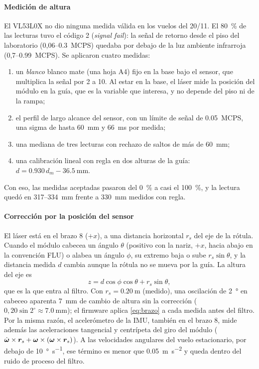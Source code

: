 \paragraph{Medición de altura} El VL53L0X no dio ninguna medida válida en los vuelos del 20/11. El \SI{80}{\percent} de las lecturas tuvo el código 2 (\emph{signal fail}): la señal de retorno desde el piso del laboratorio (0,06--\SI{0.3}{MCPS}) quedaba por debajo de la luz ambiente infrarroja (0,7--\SI{0.99}{MCPS}). Se aplicaron cuatro medidas:
\begin{enumerate}[label=(\roman*)]
  \item un \emph{blanco} blanco mate (una hoja A4) fijo en la base bajo el sensor, que multiplica la señal por 2 a 10. Al estar en la base, el láser mide la posición del módulo en la guía, que es la variable que interesa, y no depende del piso ni de la rampa;
  \item el perfil de largo alcance del sensor, con un límite de señal de \SI{0.05}{MCPS}, una sigma de hasta \SI{60}{\milli\metre} y \SI{66}{\milli\second} por medida;
  \item una mediana de tres lecturas con rechazo de saltos de más de \SI{60}{\milli\metre};
  \item una calibración lineal con regla en dos alturas de la guía: $d=0.930\,d_m-\SI{36.5}{\milli\metre}$.
\end{enumerate}
Con eso, las medidas aceptadas pasaron del \SI{0}{\percent} a casi el \SI{100}{\percent}, y la lectura quedó en 317--\SI{334}{\milli\metre} frente a \SI{330}{\milli\metre} medidos con regla.

\paragraph{Corrección por la posición del sensor} El láser está en el brazo 8 ($+x$), a una distancia horizontal $r_s$ del eje de la rótula. Cuando el módulo cabecea un ángulo $\theta$ (positivo con la nariz, $+x$, hacia abajo en la convención FLU) o alabea un ángulo $\phi$, su extremo baja o sube $r_s\sin\theta$, y la distancia medida $d$ cambia aunque la rótula no se mueva por la guía. La altura del eje es
\begin{equation}
  z=d\cos\phi\cos\theta+r_s\sin\theta ,
  \label{eq:brazo}
\end{equation}
que es la que entra al filtro. Con $r_s=\SI{0.20}{\metre}$ (medido), una oscilación de \SI{2}{\degree} en cabeceo aparenta \SI{7}{\milli\metre} de cambio de altura sin la corrección ($0{,}20\sin 2^\circ\approx\SI{7.0}{\milli\metre}$); el firmware aplica \eqref{eq:brazo} a cada medida antes del filtro. Por la misma razón, el acelerómetro de la IMU, también en el brazo 8, mide además las aceleraciones tangencial y centrípeta del giro del módulo ($\dot{\bm{\omega}}\times\bm{r}_s+\bm{\omega}\times(\bm{\omega}\times\bm{r}_s)$). A las velocidades angulares del vuelo estacionario, por debajo de \SI{10}{\degree\per\second}, ese término es menor que \SI{0.05}{\metre\per\second\squared} y queda dentro del ruido de proceso del filtro.

